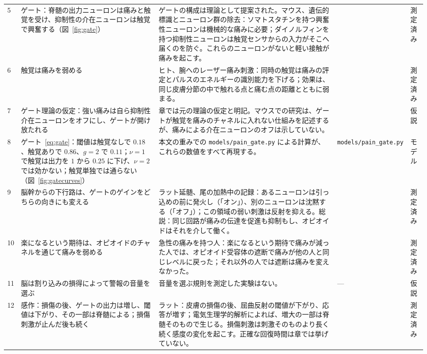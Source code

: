 {\begin{longtable}{>{\raggedright}p{0.5cm}>{\raggedright}p{4.0cm}>{\raggedright}p{5.6cm}>{\raggedright}p{2.3cm}>{\raggedright\arraybackslash}p{1.7cm}}
5 & ゲート：脊髄の出力ニューロンは痛みと触覚を受け、抑制性の介在ニューロンは触覚で興奮する（図~\ref{fig:gate}） & ゲートの構成は理論として提案された。マウス、遺伝的標識とニューロン群の除去：ソマトスタチンを持つ興奮性ニューロンは機械的な痛みに必要；ダイノルフィンを持つ抑制性ニューロンは触覚センサからの入力がそこへ届くのを防ぐ。これらのニューロンがないと軽い接触が痛みを起こす。 & \cite{MelzackWall1965, Duan2014} & 測定済み \\
6 & 触覚は痛みを弱める & ヒト、腕へのレーザー痛み刺激：同時の触覚は痛みの評定とパルスのエネルギーの識別能力を下げる；効果は、同じ皮膚分節の中で触れる点と痛む点の距離とともに弱まる。 & \cite{Mancini2014touch} & 測定済み \\
7 & ゲート理論の仮定：強い痛みは自ら抑制性介在ニューロンをオフにし、ゲートが開け放たれる & 章では元の理論の仮定と明記。マウスでの研究は、ゲートが触覚を痛みのチャネルに入れない仕組みを記述するが、痛みによる介在ニューロンのオフは示していない。 & \cite{MelzackWall1965} & 仮説 \\
8 & ゲート~\eqref{eq:gate}：閾値は触覚なしで $0.18$、触覚ありで $0.86$、$g=2$ で $0.11$；$\nu=1$ で触覚は出力を $1$ から $0.25$ に下げ、$\nu=2$ では効かない；触覚単独では通らない（図~\ref{fig:gatecurves}） & 本文の重みでの \texttt{models/\allowbreak pain\_\allowbreak gate.py} による計算が、これらの数値をすべて再現する。 & \texttt{models/\allowbreak pain\_\allowbreak gate.py} & モデル \\
9 & 脳幹からの下行路は、ゲートのゲインをどちらの向きにも変える & ラット延髄、尾の加熱中の記録：あるニューロンは引っ込めの前に発火し（「オン」）、別のニューロンは沈黙する（「オフ」）；この領域の弱い刺激は反射を抑える。総説：同じ回路が痛みの伝達を促進も抑制もし、オピオイドはそれを介して働く。 & \cite{Fields1983rvm, Fields2004} & 測定済み \\
10 & 楽になるという期待は、オピオイドのチャネルを通じて痛みを弱める & 急性の痛みを持つ人：楽になるという期待で痛みが減った人では、オピオイド受容体の遮断で痛みが他の人と同じレベルに戻った；それ以外の人では遮断は痛みを変えなかった。 & \cite{Levine1978} & 測定済み \\
11 & 脳は割り込みの損得によって警報の音量を選ぶ & 音量を選ぶ規則を測定した実験はない。 & --- & 仮説 \\
12 & 感作：損傷の後、ゲートの出力は増し、閾値は下がり、その一部は脊髄による；損傷刺激が止んだ後も続く & ラット：皮膚の損傷の後、屈曲反射の閾値が下がり、応答が増す；電気生理学的解析によれば、増大の一部は脊髄そのもので生じる。損傷刺激は刺激そのものより長く続く感度の変化を起こす。正確な回復時間は章では挙げていない。 & \cite{Woolf1983} & 測定済み \\

\end{longtable}}
